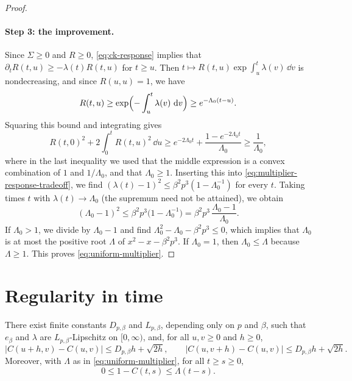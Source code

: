 \begin{proof}
\paragraph{Step 3: the improvement.}
Since $\Sigma\ge0$ and $R\ge0$, \eqref{eq:ck-response} implies that $\partial_tR(t,u)\ge-\lambda(t)R(t,u)$ for $t\ge u$. Then $t\mapsto R(t,u)\exp\int_u^t\lambda(v)\,\dd v$ is nondecreasing, and since $R(u,u)=1$, we have
\[
 R(t,u)\ge\exp\Bigl(-\int_u^t\lambda(v)\,\mathop{}\!\mathrm d v\Bigr)\ge e^{-\Lambda_0(t-u)}.
\]
Squaring this bound and integrating gives
\[
 R(t,0)^2+2\int_0^tR(t,u)^2\,\dd u
 \ge e^{-2\Lambda_0t}+\frac{1-e^{-2\Lambda_0t}}{\Lambda_0}
 \ge\frac1{\Lambda_0},
\]
where in the last inequality we used that the middle expression is a convex combination of $1$ and $1/\Lambda_0$, and that $\Lambda_0\ge1$. Inserting this into \eqref{eq:multiplier-response-tradeoff}, we find $(\lambda(t)-1)^2\le\beta^2p^3(1-\Lambda_0^{-1})$ for every $t$. Taking times $t$ with $\lambda(t)\to\Lambda_0$ (the supremum need not be attained), we obtain
\[
 (\Lambda_0-1)^2\le\beta^2p^3\bigl(1-\Lambda_0^{-1}\bigr)=\beta^2p^3\,\frac{\Lambda_0-1}{\Lambda_0}.
\]
If $\Lambda_0>1$, we divide by $\Lambda_0-1$ and find $\Lambda_0^2-\Lambda_0-\beta^2p^3\le0$, which implies that $\Lambda_0$ is at most the positive root $\Lambda$ of $x^2-x-\beta^2p^3$. If $\Lambda_0=1$, then $\Lambda_0\le\Lambda$ because $\Lambda\ge1$. This proves \eqref{eq:uniform-multiplier}.
\end{proof}

\section{Regularity in time}\label{sec:regularity}

\begin{proposition}\label{prop:global-regularity}
There exist finite constants $D_{p,\beta}$ and $L_{p,\beta}$, depending only on $p$ and $\beta$, such that $e_\beta$ and $\lambda$ are $L_{p,\beta}$-Lipschitz on $[0,\infty)$, and, for all $u,v\ge0$ and $h\ge0$,
\begin{equation}
|C(u+h,v)-C(u,v)|\le D_{p,\beta}h+\sqrt{2h},\qquad
|C(u,v+h)-C(u,v)|\le D_{p,\beta}h+\sqrt{2h}.
\label{eq:global-modulus}
\end{equation}
Moreover, with $\Lambda$ as in \eqref{eq:uniform-multiplier}, for all $t\ge s\ge0$,
\begin{equation}\label{eq:diagonal-increment}
 0\le1-C(t,s)\le\Lambda(t-s).
\end{equation}
\end{proposition}

